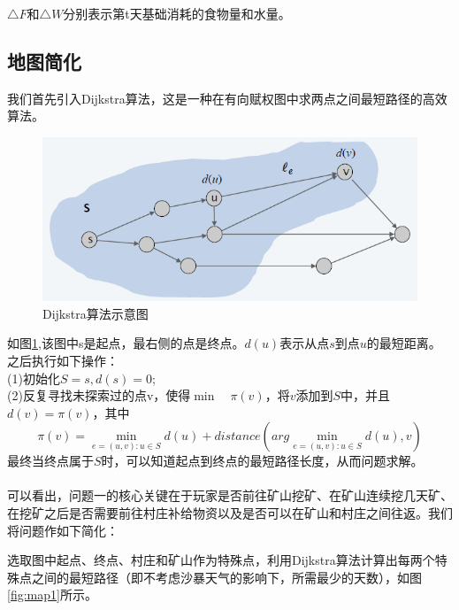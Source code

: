 \documentclass[withoutpreface,bwprint]{cumcmthesis} %
\begin{document}
$\triangle F$和$\triangle W$分别表示第t天基础消耗的食物量和水量。

\subsection{地图简化}

我们首先引入Dijkstra算法，这是一种在有向赋权图中求两点之间最短路径的高效算法。
\begin{figure}[H]
	\centering
	\includegraphics[scale=0.7]{figures/Dijkstra.png}
	\caption{Dijkstra算法示意图}
	\label{fig:Dijkstra}
\end{figure}
如图\ref{fig:Dijkstra},该图中s是起点，最右侧的点是终点。$d(u)$表示从点$s$到点$u$的最短距离。之后执行如下操作：\\
(1)初始化$S={s},d(s)=0$;\\
(2)反复寻找未探索过的点v，使得$\min\quad\pi(v)$，将$v$添加到$S$中，并且$d(v)=\pi(v)$，其中
$$\pi(v)=\min_{e=(u,v):u\in S}d(u)+distance(arg\min_{e=(u,v):u\in S}d(u),v)$$
最终当终点属于$S$时，可以知道起点到终点的最短路径长度，从而问题求解。\\\\
可以看出，问题一的核心关键在于玩家是否前往矿山挖矿、在矿山连续挖几天矿、在挖矿之后是否需要前往村庄补给物资以及是否可以在矿山和村庄之间往返。我们将问题作如下简化：

选取图中起点、终点、村庄和矿山作为特殊点，利用Dijkstra算法计算出每两个特殊点之间的最短路径（即不考虑沙暴天气的影响下，所需最少的天数），如图\ref{fig:map1}所示。
\end{document}
